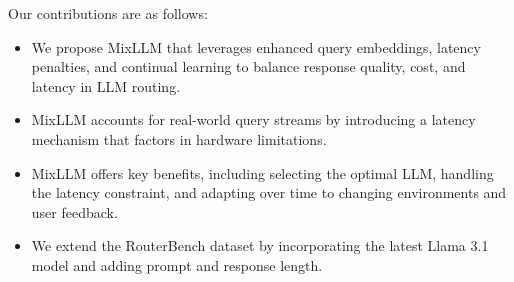 Our contributions are as follows:
\begin{itemize}[nosep]
    \item We propose MixLLM that leverages enhanced query embeddings, latency penalties, and continual learning to balance response quality, cost, and latency in LLM routing.
    \item MixLLM accounts for real-world query streams by introducing a latency mechanism that factors in hardware limitations.
    \item MixLLM offers key benefits, including selecting the optimal LLM, handling the latency constraint, and adapting over time to changing environments and user feedback.
    \item We extend the RouterBench dataset by incorporating the latest Llama 3.1 model and adding prompt and response length.
\end{itemize}





